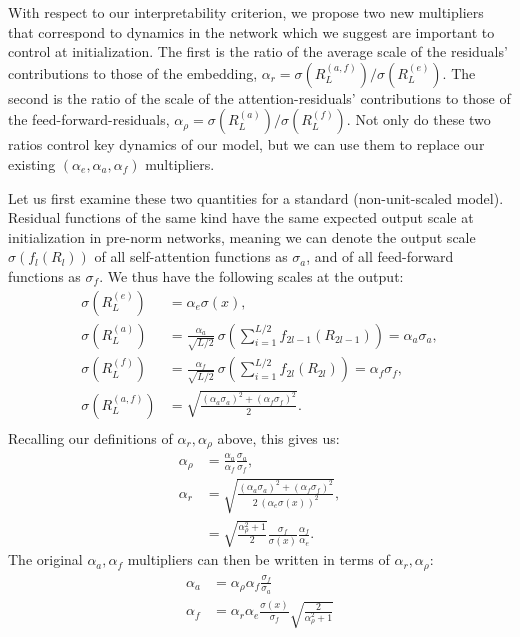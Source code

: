 With respect to our interpretability criterion, we propose two new multipliers that correspond to dynamics in the network which we suggest are important to control at initialization. The first is the ratio of the average scale of the residuals' contributions to those of the embedding, $\alpha_r = \sigma(R_L^{(a,f)}) / \sigma(R_L^{(e)})$. The second is the ratio of the scale of the attention-residuals' contributions to those of the feed-forward-residuals, $\alpha_{\rho} = \sigma(R_L^{(a)}) / \sigma(R_L^{(f)})$. Not only do these two ratios control key dynamics of our model, but we can use them to replace our existing $(\alpha_e, \alpha_a, \alpha_f)$ multipliers. 

Let us first examine these two quantities for a standard (non-unit-scaled model). Residual functions of the same kind have the same expected output scale at initialization in pre-norm networks, meaning we can denote the output scale $\sigma(f_l(R_l))$ of all self-attention functions as $\sigma_a$, and of all feed-forward functions as $\sigma_f$. We thus have the following scales at the output:
\begin{align*}
    \sigma(R_L^{(e)}) &= \alpha_e \sigma(x),
    \\
    \sigma(R_L^{(a)}) &= \frac{\alpha_a}{\sqrt{L/2}}\, \sigma\!\left(\sum_{i=1}^{L/2} f_{2l-1}(R_{2l-1})\right) = \alpha_a \sigma_a,
    \\
    \sigma(R_L^{(f)}) &= \frac{\alpha_f}{\sqrt{L/2}}\, \sigma\!\left(\sum_{i=1}^{L/2} f_{2l}(R_{2l})\right) = \alpha_f \sigma_f,
    \\
    \sigma(R_L^{(a,f)}) &= \sqrt{\frac{(\alpha_a \sigma_a)^2 + (\alpha_f \sigma_f)^2}{2}}.
    \\
\end{align*}
Recalling our definitions of $\alpha_r, \alpha_{\rho}$ above, this gives us:
\begin{align*}
    \alpha_\rho &= \frac{\alpha_a}{\alpha_f} \frac{\sigma_a}{\sigma_f},
    \\
    \alpha_r &= \sqrt{\frac{(\alpha_a \sigma_a)^2 + (\alpha_f \sigma_f)^2}{2\,(\alpha_e \sigma(x))^2}},
    \\
    &= \sqrt{\frac{\alpha_\rho^2 + 1}{2}} \frac{\sigma_f}{\sigma(x)} \frac{\alpha_f}{\alpha_e}.
\end{align*}
The original $\alpha_a, \alpha_f$ multipliers can then be written in terms of $\alpha_r, \alpha_\rho$:
\begin{align*}
    \alpha_a &= \alpha_\rho \alpha_f \frac{\sigma_f}{\sigma_a}
    \\
    \alpha_f &= \alpha_r \alpha_e \frac{\sigma(x)}{\sigma_f} \sqrt{\frac{2}{\alpha_\rho^2 + 1}}
\end{align*}
